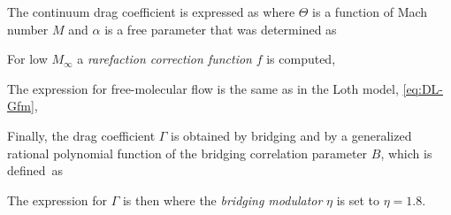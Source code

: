     The continuum drag coefficient is expressed as
    where
    $\Theta$ is a function of Mach number $M$
    and $\alpha$ is a free parameter that was determined as

    For low $M_\infty$ a \emph{rarefaction correction function} $f$ is computed,

    The expression for free-molecular flow is the same as in the Loth model, \cref{eq:DL-Gfm},

    Finally, the drag coefficient $\Gamma$ is obtained by bridging  and 
    by a generalized rational polynomial function of the bridging correlation parameter $B$,
    which is defined~as

    The expression for $\Gamma$ is then
    where the \emph{bridging modulator} $\eta$ is set to $\eta = \num{1.8}$.
